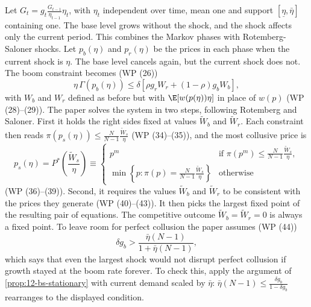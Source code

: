 Let $G_t = g_t\frac{G_{t-1}}{\eta_{t-1}}\eta_t$, with $\eta_t$ independent over time, mean one and support $[\underline\eta, \bar\eta]$
containing one. The base level grows without the shock, and the shock affects only the current period. This combines
the Markov phases with Rotemberg-Saloner shocks. Let $p_b(\eta)$ and $p_r(\eta)$ be the prices in each phase when
the current shock is $\eta$. The base level cancels again, but the current shock does not. The boom constraint becomes
(WP (26))
\begin{equation*}
\eta\,\Gamma(p_b(\eta)) \le \delta\left[\rho g_r W_r + (1-\rho)g_b W_b\right],
\end{equation*}
with $W_b$ and $W_r$ defined as before but with $\E[w(p(\eta))\eta]$ in place of $w(p)$ (WP (28)--(29)). The paper solves
the system in two steps, following Rotemberg and Saloner. First it holds the right sides fixed at values
$\tilde W_b$ and $\tilde W_r$. Each constraint then reads $\pi(p_s(\eta)) \le \frac{N}{N-1}\frac{\tilde W_s}{\eta}$ (WP (34)--(35)), and the most
collusive price is
\begin{equation}\label{eq:12-bs-transitory-price}
p_s(\eta) = P^*\!\left(\frac{\tilde W_s}{\eta}\right) \equiv
\begin{cases}
p^m & \text{if } \pi(p^m) \le \frac{N}{N-1}\frac{\tilde W_s}{\eta},\\
\min\left\{p : \pi(p) = \frac{N}{N-1}\frac{\tilde W_s}{\eta}\right\} & \text{otherwise}
\end{cases}
\end{equation}
(WP (36)--(39)). Second, it requires the values $\tilde W_b$ and $\tilde W_r$ to be consistent with the prices they generate
(WP (40)--(43)). It then picks the largest fixed point of the resulting pair of equations. The competitive outcome
$\tilde W_b = \tilde W_r = 0$ is always a fixed point. To leave room for perfect collusion the paper assumes (WP (44))
\begin{equation*}
\delta g_b > \frac{\bar\eta(N-1)}{1 + \bar\eta(N-1)},
\end{equation*}
which says that even the largest shock would not disrupt perfect collusion if growth stayed at the boom rate forever.
To check this, apply the argument of \cref{prop:12-bs-stationary} with current demand scaled by $\bar\eta$:
$\bar\eta(N-1) \le \frac{\delta g_b}{1 - \delta g_b}$ rearranges to the displayed condition.

